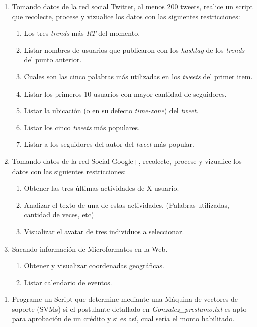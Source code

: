 \documentclass{article}
\begin{document}
\begin{enumerate}
\item Tomando datos de la red social Twitter, al menos 200 tweets, realice un script que recolecte, procese y vizualice los datos con las siguientes restricciones:
\begin{enumerate}
	\item Los tres \emph{trends} más \emph{RT} del momento.
	\item Listar nombres de usuarios que publicaron con los \emph{hashtag} de los \emph{trends} del punto anterior.
	\item Cuales son las cinco palabras más utilizadas en los \emph{tweets} del primer item.
	\item Listar los primeros 10 usuarios con mayor cantidad de seguidores. 	
	\item Listar la ubicación (o en su defecto \emph{time-zone}) del \emph{tweet}.
	\item Listar los cinco \emph{tweets} más populares.
	\item Listar a los seguidores del autor del \emph{tweet} más popular.
\end{enumerate}
\item Tomando datos de la red Social Google+, recolecte, procese y vizualice los datos con las siguientes restricciones:
\begin{enumerate}
	\item Obtener las tres últimas actividades de X usuario. 
	\item Analizar el texto de una de estas actividades. (Palabras utilizadas, cantidad de veces, etc)
	\item Visualizar el avatar de tres individuos a seleccionar.
\end{enumerate}
\item Sacando información de Microformatos en la Web.
\begin{enumerate}
	\item Obtener y visualizar coordenadas geográficas.
	\item Listar calendario de eventos.
\end{enumerate}
\end{enumerate}
\begin{enumerate}
\item Programe un Script que determine mediante una Máquina de vectores de soporte (SVMs) si el postulante detallado en \emph{Gonzalez\_prestamo.txt} es apto para aprobación de un crédito y si es así, cual sería el monto habilitado.

\end{enumerate}
\end{document}
